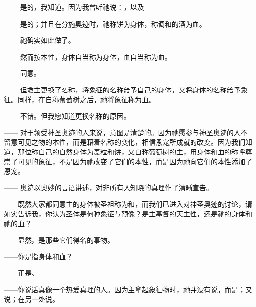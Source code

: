 —— 是的，我知道。因为我曾听祂说：，以及\par

—— 是的；并且在分施奥迹时，祂称饼为身体，称调和的酒为血。\par

—— 祂确实如此做了。\par

—— 然而按本性，身体自当称为身体，血自当称为血。\par

—— 同意。\par

—— 但救主更换了名称，将象征的名称给予自己的身体，又将身体的名称给予象征。同样，在自称葡萄树之后，祂将象征称为血。\par

—— 不错。但我愿知道更换名称的原因。\par

—— 对于领受神圣奥迹的人来说，意图是清楚的。因为祂愿参与神圣奥迹的人不留意可见之物的本性，而是藉着名称的变化，相信恩宠所成就的改变。因为我们知道，那位称自己的自然身体为麦粒和饼，又自称葡萄树的主，用身体和血的称呼尊崇了可见的象征，不是因为祂改变了它们的本性，而是因为祂向它们的本性添加了恩宠。\par

—— 奥迹以奥妙的言语讲述，对非所有人知晓的真理作了清晰宣告。\par

——既然大家都同意主的身体被圣祖称为和，而我们已进入对神圣奥迹的讨论，请如实告诉我，你认为圣体是何种象征与预像？是主基督的天主性，还是祂的身体和祂的血？\par

——显然，是那些它们得名的事物。\par

——你是指身体和血？\par

——正是。\par

——你说话真像一个热爱真理的人。因为主拿起象征物时，祂并没有说，而是；又说；在另一处说。\par

